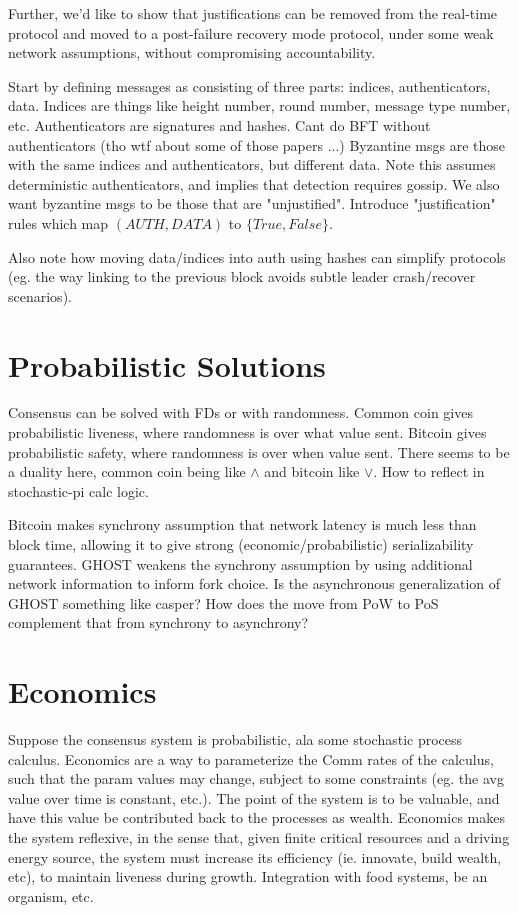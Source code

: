 Further, we'd like to show that justifications can be removed from the real-time
protocol and moved to a post-failure recovery mode protocol, under some weak network assumptions,
without compromising accountability.

Start by defining messages as consisting of three parts: indices, authenticators, data.
Indices are things like height number, round number, message type number, etc.
Authenticators are signatures and hashes.
Cant do BFT without authenticators (tho wtf about some of those papers ...)
Byzantine msgs are those with the same indices and authenticators, but different data.
Note this assumes deterministic authenticators, and implies that detection requires gossip.
We also want byzantine msgs to be those that are "unjustified".
Introduce "justification" rules which map $(AUTH, DATA)$ to $\{True, False\}$.

Also note how moving data/indices into auth using hashes can simplify protocols
(eg. the way linking to the previous block avoids subtle leader crash/recover scenarios).

\section{Probabilistic Solutions}
Consensus can be solved with FDs or with randomness.
Common coin gives probabilistic liveness, where randomness is over what value sent.
Bitcoin gives probabilistic safety, where randomness is over when value sent.
There seems to be a duality here, common coin being like $\wedge$ and bitcoin like $\vee$.
How to reflect in stochastic-pi calc logic.

Bitcoin makes synchrony assumption that network latency is much less than block time,
allowing it to give strong (economic/probabilistic) serializability guarantees.
GHOST weakens the synchrony assumption by using additional network information to inform fork choice.
Is the asynchronous generalization of GHOST something like casper?
How does the move from PoW to PoS complement that from synchrony to asynchrony?

\section{Economics}
Suppose the consensus system is probabilistic, ala some stochastic process calculus.
Economics are a way to parameterize the Comm rates of the calculus,
such that the param values may change, subject to some constraints 
(eg. the avg value over time is constant, etc.).
The point of the system is to be valuable,
and have this value be contributed back to the processes as wealth.
Economics makes the system reflexive, in the sense that,
given finite critical resources and a driving energy source,
the system must increase its efficiency (ie. innovate, build wealth, etc),
to maintain liveness during growth.
Integration with food systems, be an organism, etc.

